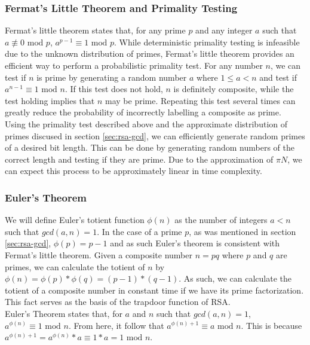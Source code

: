 		\subsubsection{Fermat's Little Theorem and Primality Testing}\label{sec:rsa-fermat}
			Fermat's little theorem states that, for any prime $p$ and any integer $a$ such that $a\not\equiv0\text{ mod }p$, $a^{p-1}\equiv1\text{ mod }p$. While deterministic primality
			testing is infeasible due to the unknown distribution of primes, Fermat's little theorem provides an efficient way to perform a probabilistic primality test. For any number
			$n$, we can test if $n$ is prime by generating a random number $a$ where $1\leq a<n$ and test if $a^{n-1}\equiv1\text{ mod }n$. If this test does not hold, $n$ is definitely
			composite, while the test holding implies that $n$ may be prime. Repeating this test several times can greatly reduce the probability of incorrectly labelling a composite as
			prime.\\

			Using the primality test described above and the approximate distribution of primes discused in section \ref{sec:rsa-gcd}, we can efficiently generate random primes of a desired bit
			length. This can be done by generating random numbers of the correct length and testing if they are prime. Due to the approximation of $\pi{N}$, we can expect this process to
			be approximately linear in time complexity.

		\subsubsection{Euler's Theorem}\label{sec:rsa-eulers}
			We will define Euler's totient function $\phi(n)$ as the number of integers $a<n$ such that $gcd(a, n)=1$. In the case of a prime $p$, as was mentioned in section \ref{sec:rsa-gcd},
			$\phi(p)=p-1$ and as such Euler's theorem is consistent with Fermat's little theorem. Given a composite number $n=pq$ where $p$ and $q$ are primes, we can calculate the totient of
			$n$ by $\phi(n)=\phi(p)*\phi(q)=(p-1)*(q-1)$. As such, we can calculate the totient of a composite number in constant time if we have its prime factorization. This fact serves as 
			the basis of the trapdoor function of RSA.\\

			Euler's Theorem states that, for $a$ and $n$ such that $gcd(a,n)=1$, $a^{\phi(n)}\equiv 1\text{ mod }n$. From here, it follow that $a^{\phi(n)+1}\equiv a\text{ mod }n$. This is
			because $a^{\phi(n)+1}=a^{\phi(n)}*a\equiv 1*a=1\text{ mod }n$.

